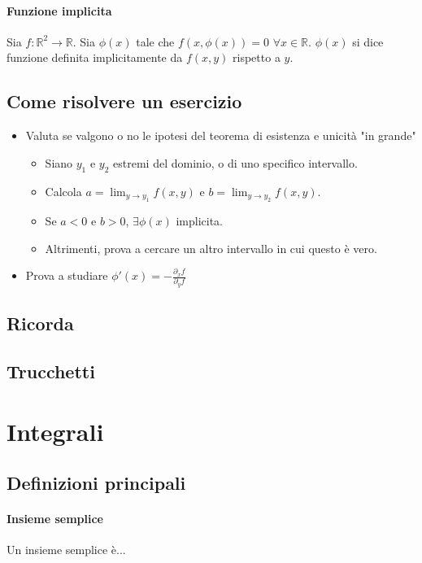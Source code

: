 \documentclass[a4paper,10pt]{book}
\begin{document}
\paragraph{Funzione implicita}
Sia $f: \mathbb{R}^2 \rightarrow \mathbb{R}$.
Sia $\phi(x)$ tale che $f(x, \phi(x)) = 0$ $\forall x \in \mathbb{R}$. $\phi(x)$ si dice funzione definita implicitamente da $f(x, y)$ rispetto a $y$.

\subsection{Come risolvere un esercizio}
\begin{itemize}
 \item Valuta se valgono o no le ipotesi del teorema di esistenza e unicità "in grande"
 \begin{itemize}
  \item Siano $y_1$ e $y_2$ estremi del dominio, o di uno specifico intervallo.
  \item Calcola $a = \lim_{y \to y_1}{f(x, y)}$ e $b = \lim_{y \to y_2}{f(x, y)}$.
  \item Se $a < 0$ e $b > 0$, $\exists \phi(x)$ implicita.
  \item Altrimenti, prova a cercare un altro intervallo in cui questo è vero.
 \end{itemize}
 \item Prova a studiare $\phi'(x) = -\displaystyle\frac{\partial_x f}{\partial_y f}$
\end{itemize}

\subsection{Ricorda}
\subsection{Trucchetti}

\section{Integrali}
\subsection{Definizioni principali}
\paragraph{Insieme semplice}
Un insieme semplice è...
\end{document}
